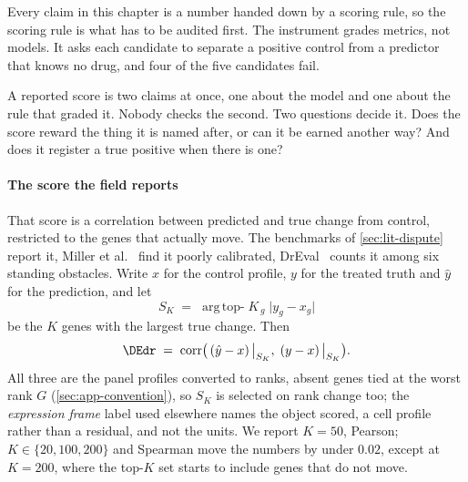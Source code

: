 
\label{sec:methods-metrics}   %


\begin{question}[1]
Every claim in this chapter is a number handed down by a scoring rule, so the
scoring rule is what has to be audited first. The instrument grades metrics, not
models. It asks each candidate to separate a positive control from a predictor
that knows no drug, and four of the five candidates fail.
\end{question}

\noindent
A reported score is two claims at once, one about the model and one about the
rule that graded it. Nobody checks the second. Two questions decide it. Does the
score reward the thing it is named after, or can it be earned another way? And
does it register a true positive when there is one?

\paragraph{The score the field reports} That score is a correlation between
predicted and true change from control, restricted to the genes that actually
move. The benchmarks of \cref{sec:lit-dispute} report it,
Miller et al.~\cite{miller} find it poorly calibrated, DrEval~\cite{dreval}
counts it among six standing obstacles. Write $x$ for the control profile, $y$
for the treated truth and $\hat y$ for the
prediction, and let
\begin{equation}
 S_K \;=\; \operatorname*{arg\,top-}K_{\,g} \; \lvert y_g - x_g \rvert
\end{equation}
be the $K$ genes with the largest true change. Then
\begin{equation}
 \DEdr \;=\; \operatorname{corr}\!\big( \left(\hat{y} - x\right)\big|_{S_K}, \;
 \left(y - x\right)\big|_{S_K} \big).
\end{equation}
All three are the panel profiles converted to ranks, absent genes tied at the
worst rank $G$ (\cref{sec:app-convention}), so $S_K$ is selected on rank change
too; the \emph{expression frame} label used elsewhere names the object scored, a
cell profile rather than a residual, and not the units. We report $K = 50$,
Pearson; $K \in \{20, 100, 200\}$ and Spearman move the
numbers by under $0.02$, except at $K = 200$, where the top-$K$ set starts to
include genes that do not move.

